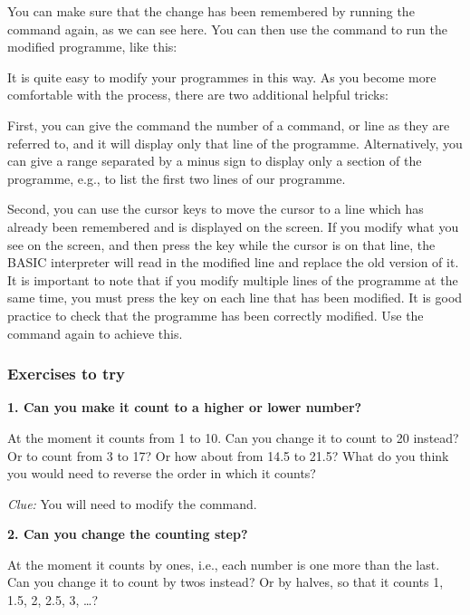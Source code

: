 You can make sure that the change has been remembered by running the  command again, as we can see here.
You can then use the  command to run the modified
programme, like this:


It is quite easy to modify your programmes in this way.  As you become more comfortable with the process, there are two
additional helpful tricks:

First, you can give the  command the number of a command, or line as they are referred to, and it will display only
that line of the programme.  Alternatively, you can give a range separated by a minus sign to display only a section of the programme,
e.g.,  to list the first two lines of our programme.

Second, you can use the cursor keys to move the cursor to a line which has already been remembered and is displayed on the screen. If you
modify what you see on the screen, and then press the  key while the cursor is on that line, the BASIC interpreter will
read in the modified line and replace the old version of it.  It is important to note that if you modify multiple lines of the programme
at the same time, you must press the  key on each line that has been modified. It is good practice to check that the
programme has been correctly modified. Use the  command again to achieve this.
  
  
  \subsubsection{Exercises to try}

  {\bf 1. Can you make it count to a higher or lower number?}

  At the moment it counts from 1 to 10.  Can you change it to count to 20 instead?  Or to count from 3 to 17?
  Or how about from 14.5 to 21.5? What do you think you would need to reverse the order in which it counts?

  {\em Clue:} You will need to modify the  command.  

  {\bf 2. Can you change the counting step?}

  At the moment it counts by ones, i.e., each number is one more than the last.  Can you change it to count by twos
  instead? Or by halves, so that it counts 1, 1.5, 2, 2.5, 3, \ldots?
  
